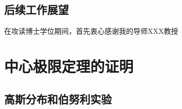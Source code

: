 \documentclass[master]{thesis-uestc}
\begin{document}
\section{后续工作展望}

\thesisacknowledgement
在攻读博士学位期间，首先衷心感谢我的导师XXX教授

\thesisappendix

\chapter{中心极限定理的证明}

\section{高斯分布和伯努利实验}





% 

% 
% 



\end{document}
